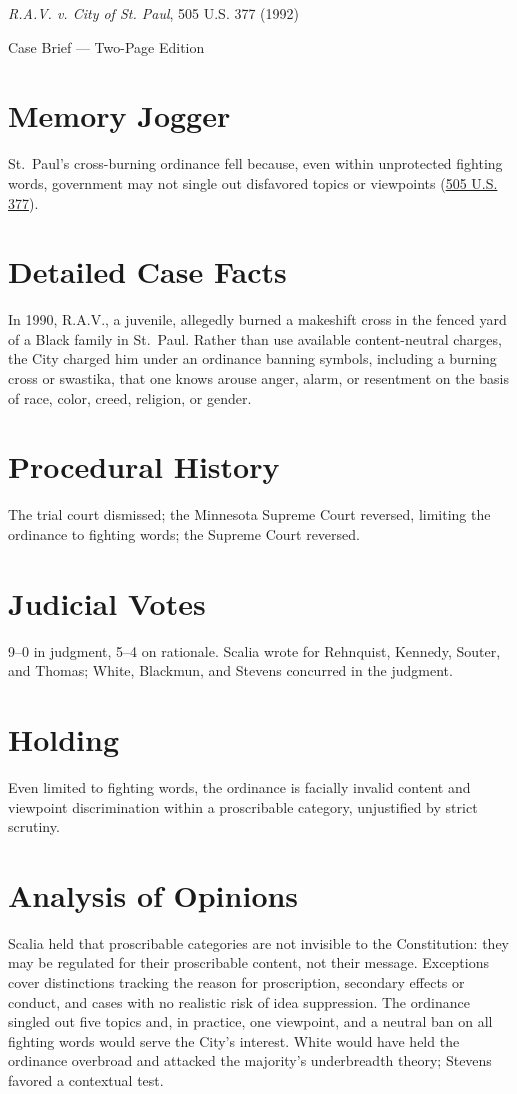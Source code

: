 \documentclass[12pt]{article}
\begin{document}
\begin{center}
{\LARGE \textit{R.A.V. v. City of St. Paul}, 505 U.S. 377 (1992)\par}
\vspace{0.5em}
{\large Case Brief --- Two-Page Edition\par}
\end{center}

\section{Memory Jogger}
St.~Paul's cross-burning ordinance fell because, even within unprotected fighting words, government may not single out disfavored topics or viewpoints (\href{https://supreme.justia.com/cases/federal/us/505/377/}{505 U.S. 377}).

\section{Detailed Case Facts}
In 1990, R.A.V., a juvenile, allegedly burned a makeshift cross in the fenced yard of a Black family in St.~Paul. Rather than use available content-neutral charges, the City charged him under an ordinance banning symbols, including a burning cross or swastika, that one knows arouse anger, alarm, or resentment on the basis of race, color, creed, religion, or gender.

\section{Procedural History}
The trial court dismissed; the Minnesota Supreme Court reversed, limiting the ordinance to fighting words; the Supreme Court reversed.

\section{Judicial Votes}
9--0 in judgment, 5--4 on rationale. Scalia wrote for Rehnquist, Kennedy, Souter, and Thomas; White, Blackmun, and Stevens concurred in the judgment.

\section{Holding}
Even limited to fighting words, the ordinance is facially invalid content and viewpoint discrimination within a proscribable category, unjustified by strict scrutiny.

\section{Analysis of Opinions}
Scalia held that proscribable categories are not invisible to the Constitution: they may be regulated for their proscribable content, not their message. Exceptions cover distinctions tracking the reason for proscription, secondary effects or conduct, and cases with no realistic risk of idea suppression. The ordinance singled out five topics and, in practice, one viewpoint, and a neutral ban on all fighting words would serve the City's interest. White would have held the ordinance overbroad and attacked the majority's underbreadth theory; Stevens favored a contextual test.
\end{document}
